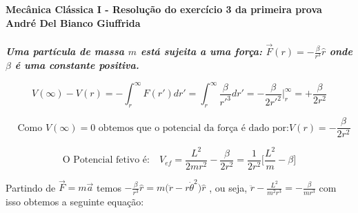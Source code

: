 \documentclass[a4paper,12pt]{exam}
\begin{document}
	\begingroup 
	  \bf Mecânica Clássica I - Resolução do exercício 3 da primeira prova\\
	  \indent André Del Bianco Giuffrida
	\endgroup
	\\ 
	\\ 
	\indent \textit{ Uma partícula de massa $m$ está sujeita a uma força:}
		$ \vec{F}(r)= -\frac{\beta}{r^3}\hat{r} $ \textit{ onde $\beta$ é uma constante positiva.}
		
		\[ V(\infty) - V(r) = - \int_{r}^{\infty} F(r')dr' = \int_{r}^{\infty} \frac{\beta}{r'^3} dr' = -\frac{\beta}{2r'^2} \Bigg|_{r}^{\infty} = +\frac{\beta}{2r^2}\]
		
		 \[\quad \text{Como $V(\infty) = 0$ obtemos que o potencial da força é dado por:} V(r) = -\frac{\beta}{2r^2} \]
		
		\[ \text{O Potencial fetivo é:} \quad V_{ef} = \frac{ L^2 }{2mr^2} - \frac{\beta}{2r^2}  = \frac{1}{2r^2} \Bigg[\frac{L^2}{m} - \beta \Bigg] \]
		
		Partindo de $\vec{F} = m\vec{a}$ temos $-\frac{\beta}{r^3}\hat{r} = m \big(\ddot{r} - r\dot{\theta}^2 \big)\hat{r} $ , ou seja, $ \ddot{r} - \frac{L^2}{m^2 r^3} = -\frac{\beta}{mr^3}$ com isso obtemos a seguinte equação:
		
\end{document}
